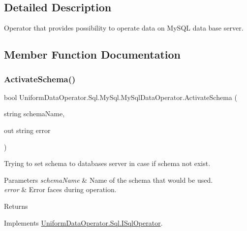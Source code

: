 \subsection{Detailed Description}
Operator that provides possibility to operate data on My\+S\+QL data base server. 



\subsection{Member Function Documentation}
\mbox{\label{class_uniform_data_operator_1_1_sql_1_1_my_sql_1_1_my_sql_data_operator_a2ed7d06bc016ae6d07cbcceffc21bbd3}} 
\subsubsection{\texorpdfstring{Activate\+Schema()}{ActivateSchema()}}
{\footnotesize\ttfamily bool Uniform\+Data\+Operator.\+Sql.\+My\+Sql.\+My\+Sql\+Data\+Operator.\+Activate\+Schema (\begin{DoxyParamCaption}\item[{string}]{schema\+Name,  }\item[{out string}]{error }\end{DoxyParamCaption})}



Trying to set schema to databases server in case if schema not exist. 


\begin{DoxyParams}{Parameters}
{\em schema\+Name} & Name of the schema that would be used.\\
\hline
{\em error} & Error faces during operation.\\
\hline
\end{DoxyParams}
\begin{DoxyReturn}{Returns}

\end{DoxyReturn}


Implements \mbox{\hyperlink{interface_uniform_data_operator_1_1_sql_1_1_i_sql_operator_a5ae8328a464ef80f1ae1bd46a573c265}{Uniform\+Data\+Operator.\+Sql.\+I\+Sql\+Operator}}.

